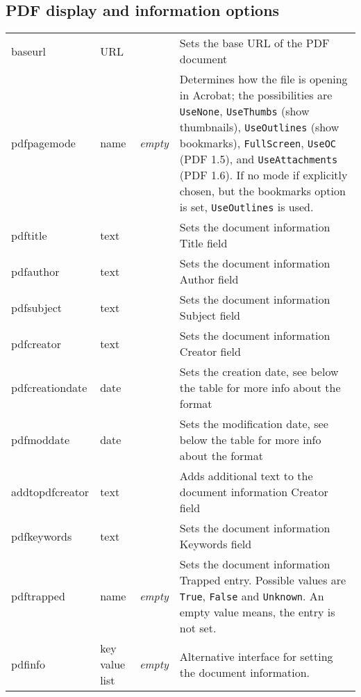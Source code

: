 \documentclass{article}
\begin{document}
\subsection{PDF display and information options}\label{sec:pdfdata}
\begin{longtable}{@{}>{\ttfamily}l>{\raggedright}p{}>{\itshape}lp{7cm}@{}}
baseurl            & URL     &       & Sets the base URL of the PDF document \\
pdfpagemode        & name    & empty & Determines how the file is opening in Acrobat; the possibilities are
                                       \verb|UseNone|, \verb|UseThumbs| (show thumbnails), \verb|UseOutlines|
                                       (show bookmarks), \verb|FullScreen|, \verb|UseOC| (PDF 1.5),
                                       and \verb|UseAttachments| (PDF 1.6). If no mode if explicitly chosen, but the
                                       bookmarks option is set, \verb|UseOutlines| is used. \\
pdftitle           & text    &       & Sets the document information Title field \\
pdfauthor          & text    &       & Sets the document information Author field \\
pdfsubject         & text    &       & Sets the document information Subject field \\
pdfcreator         & text    &       & Sets the document information Creator field \\
pdfcreationdate    & date    &       & Sets the creation date, see below the table for more info about the format\\ 
pdfmoddate         & date    &       & Sets the modification date, see below the table for more info about the format\\
addtopdfcreator    & text    &       & Adds additional text to the document information Creator field \\
pdfkeywords        & text    &       & Sets the document information Keywords field \\
pdftrapped         & name    & empty & Sets the document information Trapped entry. Possible values are \verb|True|, \verb|False| and \verb|Unknown|.
                                       An empty value means, the entry is not set.\\
%
pdfinfo            & key value list  & empty & Alternative interface for setting the
                                       document information.\\

\end{longtable}
\end{document}
